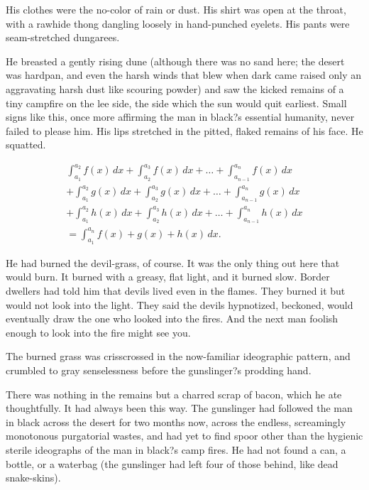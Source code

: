\documentclass[
11pt,%
tightenlines,%
twoside,%
onecolumn,%
nofloats,%
nobibnotes,%
nofootinbib,%
superscriptaddress,%
noshowpacs,%
centertags]%
{revtex4}
\begin{document}
His clothes were the no-color of rain or dust. His shirt was open at the throat, with a rawhide thong dangling loosely in hand-punched eyelets. His pants were seam-stretched dungarees.

He breasted a gently rising dune (although there was no sand here; the desert was hardpan, and even the harsh winds that blew when dark came raised only an aggravating harsh dust like scouring powder) and saw the kicked remains of a tiny campfire on the lee side, the side which the sun would quit earliest. Small signs like this, once more affirming the man in black?s essential humanity, never failed to please him. His lips stretched in the pitted, flaked remains of his face. He squatted.

\begin{multline}
\int_{a_1}^{a_2} f(x)\,dx+\int_{a_2}^{a_3} f(x)\,dx
+\dots+\int_{a_{n-1}}^{a_n} f(x)\,dx\\
+\int_{a_1}^{a_2} g(x)\,dx+\int_{a_2}^{a_3} g(x)\,dx
+\dots+\int_{a_{n-1}}^{a_n} g(x)\,dx\\
+\int_{a_1}^{a_2} h(x)\,dx+\int_{a_2}^{a_3} h(x)\,dx
+\dots+\int_{a_{n-1}}^{a_n} h(x)\,dx\\
=\int_{a_1}^{a_n} f(x)+g(x)+h(x)\,dx.
\end{multline}

He had burned the devil-grass, of course. It was the only thing out here that would burn. It burned with a greasy, flat light, and it burned slow. Border dwellers had told him that devils lived even in the flames. They burned it but would not look into the light. They said the devils hypnotized, beckoned, would eventually draw the one who looked into the fires. And the next man foolish enough to look into the fire might see you.

The burned grass was crisscrossed in the now-familiar ideographic pattern, and crumbled to gray senselessness before the gunslinger?s prodding hand. 

There was nothing in the remains but a charred scrap of bacon, which he ate thoughtfully. It had always been this way. The gunslinger had followed the man in black across the desert for two months now, across the endless, screamingly monotonous purgatorial wastes, and had yet to find spoor other than the hygienic sterile ideographs of the man in black?s camp fires. He had not found a can, a bottle, or a waterbag (the gunslinger had left four of those behind, like dead snake-skins).
\end{document}

